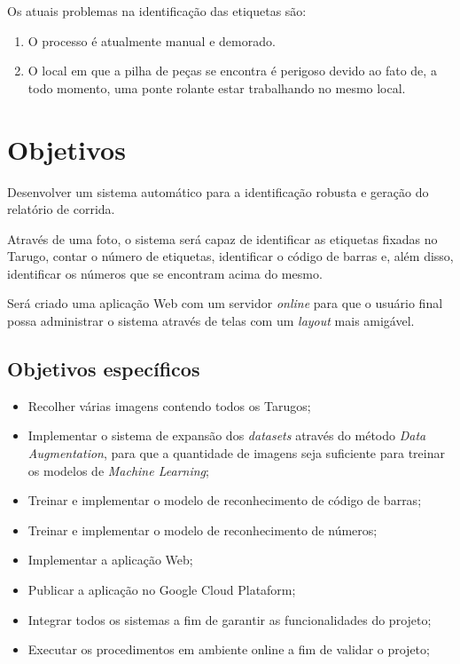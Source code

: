 Os atuais problemas na identificação das etiquetas são: 
\begin{enumerate}
	\item O processo é atualmente manual e demorado.
	\item O local em que a pilha de peças se encontra é perigoso devido ao fato de, a todo momento, uma ponte rolante estar trabalhando no mesmo local.
\end{enumerate}


\section{Objetivos} 

Desenvolver um sistema automático para a identificação robusta e geração do relatório de corrida.

Através de uma foto, o sistema será capaz de identificar as etiquetas fixadas no Tarugo, contar o número de etiquetas, identificar o código de barras e, além disso, identificar os números que se encontram acima do mesmo.

Será criado uma aplicação Web com um servidor \textit{online} para que o usuário final possa administrar o sistema através de telas com um \textit{layout} mais amigável.

\subsection{Objetivos específicos}

\begin{itemize}
	\item Recolher várias imagens contendo todos os Tarugos;
	\item Implementar o sistema de expansão dos \textit{datasets} através do método \textit{Data Augmentation}, para que a quantidade de imagens seja suficiente para treinar os modelos de \textit{Machine Learning};
	\item Treinar e implementar o modelo de reconhecimento de código de barras;
	\item Treinar e implementar o modelo de reconhecimento de números;
	\item Implementar a aplicação Web;
	\item Publicar a aplicação no Google Cloud Plataform;
	\item Integrar todos os sistemas a fim de garantir as funcionalidades do projeto;
	\item Executar os procedimentos em ambiente online a fim de validar o projeto;
\end{itemize}

